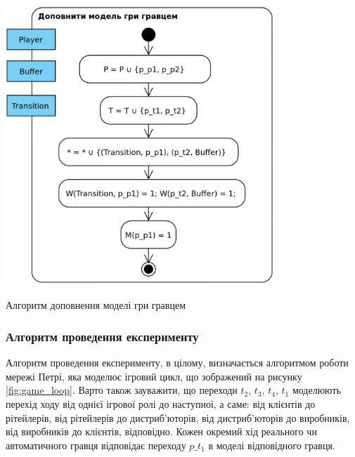 \begin{stdfigure}  
    \includegraphics[width=4in]{images/add_player.png}
    \caption{Алгоритм доповнення моделі гри гравцем}
    \label{fig:net_add_player}
\end{stdfigure}
\subsubsection{Алгоритм проведення експерименту}
Алгоритм проведення експерименту, в цілому, визначається алгоритмом роботи мережі Петрі, яка моделює ігровий цикл, що зображений на рисунку \ref{fig:game_loop}. Варто також зауважити, що переходи $t_2$, $t_3$, $t_4$, $t_1$ моделюють перехід ходу від однієї ігрової ролі до наступної, а саме: від клієнтів до рітейлерів, від рітейлерів до дистриб’юторів, від дистриб’юторів до виробників, від виробників до клієнтів, відповідно. Кожен окремий хід реального чи автоматичного гравця відповідає переходу $p\_t_1$ в моделі відповідного гравця.
 
